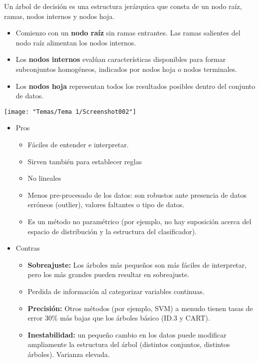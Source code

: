 Un árbol de decisión es una estructura jerárquica que consta de un nodo raíz, ramas, nodos internos y nodos hoja.
\begin{itemize}
	\item Comienzo con un \textbf{nodo raíz} sin ramas entrantes. Las ramas salientes del nodo raíz alimentan los nodos internos.
	\item Los \textbf{nodos internos} evalúan características disponibles para formar subconjuntos homogéneos, indicados por nodos hoja o nodos terminales.
	\item Los \textbf{nodos hoja} representan todos los resultados posibles dentro del conjunto de datos.
\end{itemize}
\begin{center}
	\texttt{[image: "Temas/Tema 1/Screenshot002"]}
\end{center}
\begin{itemize}[label=\color{lightblue}\textbullet]
	\item Pros
	\begin{itemize}
		\item Fáciles de entender e interpretar.
		\item Sirven también para establecer reglas
		\item No lineales
		\item Menos pre-procesado de los datos: son robustos ante presencia de datos erróneos (outlier), valores faltantes o tipo de datos.
		\item Es un método no paramétrico (por ejemplo, no hay suposición acerca del espacio de distribución y la estructura del clasificador).
	\end{itemize}
	\item Contras
	\begin{itemize}
		\item \textbf{Sobreajuste:} Los árboles más pequeños son más fáciles de interpretar, pero los más grandes pueden resultar en sobreajuste.
		\item Perdida de información al categorizar variables continuas.
		\item \textbf{Precisión:} Otros métodos (por ejemplo, SVM) a menudo tienen tasas de error 30\% más bajas que los árboles básico (ID.3 y CART).
		\item \textbf{Inestabilidad:} un pequeño cambio en los datos puede modificar ampliamente la estructura del árbol (distintos conjuntos, distintos árboles). Varianza elevada.
	\end{itemize}
\end{itemize}
